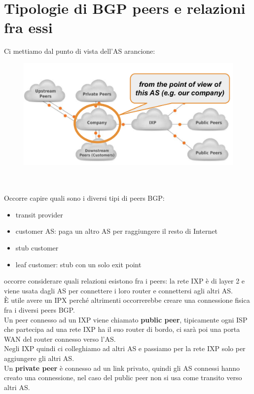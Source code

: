\documentclass[12pt, oneside]{extbook} %
\begin{document}
\section{Tipologie di BGP peers e relazioni fra essi}
Ci mettiamo dal punto di vista dell'AS arancione:\\
\begin{figure}[h!]
    \centering
    \includegraphics[scale=0.5]{../../immagini/bgp_rel}
\end{figure}\\\\
Occorre capire quali sono i diversi tipi di peers BGP:
\begin{itemize}
    \item transit provider
    \item customer AS: paga un altro AS per raggiungere il resto di Internet
    \item stub customer
    \item leaf customer: stub con un solo exit point
\end{itemize}
occorre considerare quali relazioni esistono fra i peers: la rete IXP è di layer 2 e viene usata dagli AS per connettere i loro router e connettersi agli altri AS.
\\È utile avere un IPX perché altrimenti occorrerebbe creare una connessione fisica fra i diversi peers BGP.
\\Un peer connesso ad un IXP viene chiamato \textbf{public peer}, tipicamente ogni ISP che partecipa ad una rete IXP ha il suo router di bordo, ci sarà poi una porta WAN del router connesso verso l'AS.
\\Negli IXP quindi ci colleghiamo ad altri AS e passiamo per la rete IXP solo per aggiungere gli altri AS.
\\Un \textbf{private peer} è connesso ad un link privato, quindi gli AS connessi hanno creato una connessione, nel caso del public peer non si usa come transito verso altri AS.
\end{document}

